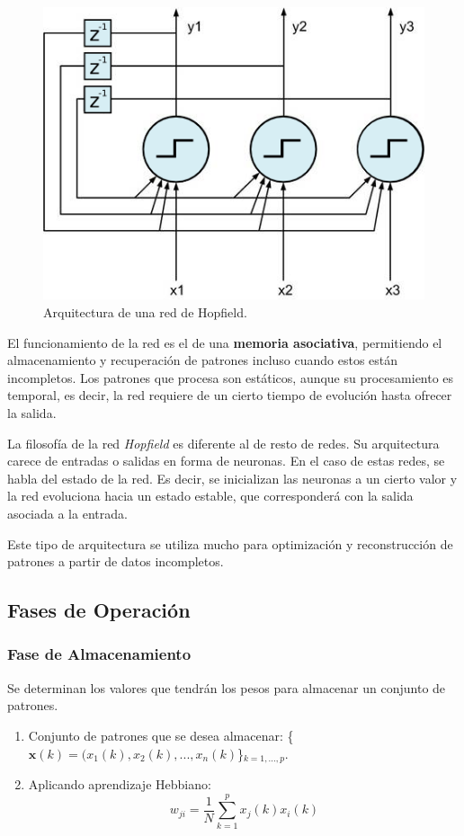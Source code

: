\documentclass[10pt,a4paper]{article}
\begin{document}
\begin{figure}
  \label{fig:hopfield}
  \caption{Arquitectura de una red de Hopfield.}
  \centering
  \hbox{\includegraphics[width=0.5\textwidth-\fboxrule-\fboxrule]{hopfield.png}}  
\end{figure}	

El funcionamiento de la red es el de una \textbf{memoria asociativa}, permitiendo el almacenamiento y recuperación de patrones incluso cuando estos están incompletos. Los patrones que procesa son estáticos, aunque su procesamiento es temporal, es decir, la red requiere de un cierto tiempo de evolución hasta ofrecer la salida.

La filosofía de la red \textit{Hopfield} es diferente al de resto de redes. Su arquitectura carece de entradas o salidas en forma de neuronas. En el caso de estas redes, se habla del estado de la red. Es decir, se inicializan las neuronas a un cierto valor y la red evoluciona hacia un estado estable, que corresponderá con la salida asociada a la entrada.

Este tipo de arquitectura se utiliza mucho para optimización y reconstrucción de patrones a partir de datos incompletos.

\subsection{Fases de Operación}
\subsubsection{Fase de Almacenamiento}
Se determinan los valores que tendrán los pesos para almacenar un conjunto de patrones.
\begin{enumerate}
\item Conjunto de patrones que se desea almacenar: \{$\mathbf{x}(k)=(x_1(k), x_2(k), ..., x_n(k)$\}$_{k=1,...,p}$.
\item Aplicando aprendizaje Hebbiano:
\[w_{ji}=\frac{1}{N}\sum_{k=1}^p x_{j}(k) x_{i}(k)\]
\end{enumerate}
\end{document}

